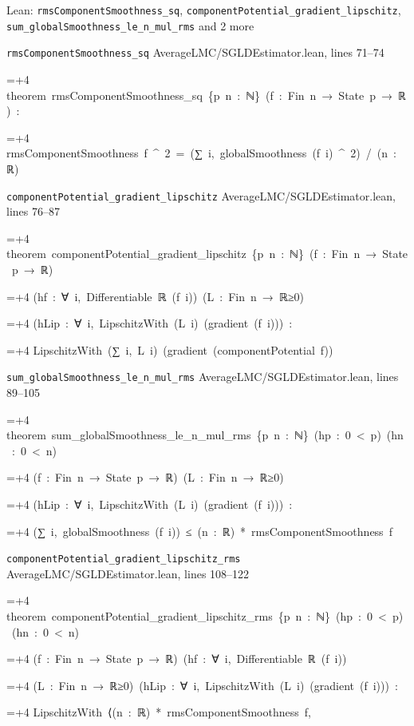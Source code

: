 \documentclass[11pt,a4paper]{article}
\newlength{\leancharwidth}
\newenvironment{leancode}{\par\smallskip\begingroup\ttfamily\footnotesize\raggedright
  \settowidth{\leancharwidth}{M}\setlength{\parskip}{0pt}\setlength{\parindent}{0pt}
  \frenchspacing}{\par\endgroup\smallskip}
\newcommand{\leanline}[2]{\hangindent=\dimexpr#1\leancharwidth+4\leancharwidth\relax
  \hangafter=1\noindent\hspace*{#1\leancharwidth}#2\par}
\newcommand{\leansource}[1]{\par{\footnotesize\color{leanmuted}#1}\par}
\begin{document}
\begin{leanbox}{Lean: \texttt{rmsComponentSmoothness\_\allowbreak{}sq}, \texttt{componentPotential\_\allowbreak{}gradient\_\allowbreak{}lipschitz}, \texttt{sum\_\allowbreak{}globalSmoothness\_\allowbreak{}le\_\allowbreak{}n\_\allowbreak{}mul\_\allowbreak{}rms} and 2 more}
\leansource{\texttt{rmsComponentSmoothness\_\allowbreak{}sq} \quad AverageLMC/\allowbreak{}SGLDEstimator.lean, lines 71–74}
\begin{leancode}
\leanline{0}{theorem\ rmsComponentSmoothness\_sq\ \{p\ n\ :\ ℕ\}\ (f\ :\ Fin\ n\ →\ State\ p\ →\ ℝ)\ :}
\leanline{4}{rmsComponentSmoothness\ f\ \textasciicircum{}\ 2\ =\ (∑\ i,\ globalSmoothness\ (f\ i)\ \textasciicircum{}\ 2)\ /\ (n\ :\ ℝ)}
\end{leancode}
\leansource{\texttt{componentPotential\_\allowbreak{}gradient\_\allowbreak{}lipschitz} \quad AverageLMC/\allowbreak{}SGLDEstimator.lean, lines 76–87}
\begin{leancode}
\leanline{0}{theorem\ componentPotential\_gradient\_lipschitz\ \{p\ n\ :\ ℕ\}\ (f\ :\ Fin\ n\ →\ State\ p\ →\ ℝ)}
\leanline{4}{(hf\ :\ ∀\ i,\ Differentiable\ ℝ\ (f\ i))\ (L\ :\ Fin\ n\ →\ ℝ≥0)}
\leanline{4}{(hLip\ :\ ∀\ i,\ LipschitzWith\ (L\ i)\ (gradient\ (f\ i)))\ :}
\leanline{4}{LipschitzWith\ (∑\ i,\ L\ i)\ (gradient\ (componentPotential\ f))}
\end{leancode}
\leansource{\texttt{sum\_\allowbreak{}globalSmoothness\_\allowbreak{}le\_\allowbreak{}n\_\allowbreak{}mul\_\allowbreak{}rms} \quad AverageLMC/\allowbreak{}SGLDEstimator.lean, lines 89–105}
\begin{leancode}
\leanline{0}{theorem\ sum\_globalSmoothness\_le\_n\_mul\_rms\ \{p\ n\ :\ ℕ\}\ (hp\ :\ 0\ <\ p)\ (hn\ :\ 0\ <\ n)}
\leanline{4}{(f\ :\ Fin\ n\ →\ State\ p\ →\ ℝ)\ (L\ :\ Fin\ n\ →\ ℝ≥0)}
\leanline{4}{(hLip\ :\ ∀\ i,\ LipschitzWith\ (L\ i)\ (gradient\ (f\ i)))\ :}
\leanline{4}{(∑\ i,\ globalSmoothness\ (f\ i))\ ≤\ (n\ :\ ℝ)\ *\ rmsComponentSmoothness\ f}
\end{leancode}
\leansource{\texttt{componentPotential\_\allowbreak{}gradient\_\allowbreak{}lipschitz\_\allowbreak{}rms} \quad AverageLMC/\allowbreak{}SGLDEstimator.lean, lines 108–122}
\begin{leancode}
\leanline{0}{theorem\ componentPotential\_gradient\_lipschitz\_rms\ \{p\ n\ :\ ℕ\}\ (hp\ :\ 0\ <\ p)\ (hn\ :\ 0\ <\ n)}
\leanline{4}{(f\ :\ Fin\ n\ →\ State\ p\ →\ ℝ)\ (hf\ :\ ∀\ i,\ Differentiable\ ℝ\ (f\ i))}
\leanline{4}{(L\ :\ Fin\ n\ →\ ℝ≥0)\ (hLip\ :\ ∀\ i,\ LipschitzWith\ (L\ i)\ (gradient\ (f\ i)))\ :}
\leanline{4}{LipschitzWith\ ⟨(n\ :\ ℝ)\ *\ rmsComponentSmoothness\ f,}

\end{leancode}
\end{leanbox}
\end{document}
